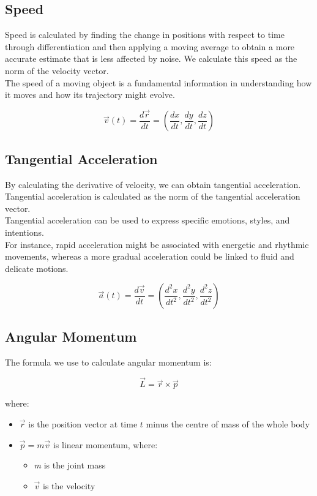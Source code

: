\subsection{Speed}
Speed is calculated by finding the change in positions with respect to time through differentiation and then applying a moving average to obtain a more accurate estimate that is less affected by noise.
We calculate this speed as the norm of the velocity vector. \\
The speed of a moving object is a fundamental information in understanding how it moves and how its trajectory might evolve.

\begin{equation}
  \vec{v}(t) = \frac{d\vec{r}}{dt} = \left(\frac{dx}{dt}, \frac{dy}{dt}, \frac{dz}{dt}\right)
\end{equation}

\subsection{Tangential Acceleration}
By calculating the derivative of velocity, we can obtain tangential acceleration.
Tangential acceleration is calculated as the norm of the tangential acceleration vector. \\
Tangential acceleration can be used to express specific emotions, styles, and intentions. \\
For instance, rapid acceleration might be associated with energetic and rhythmic movements, whereas a more gradual acceleration could be linked to fluid and delicate motions.

\begin{equation}
  \vec{a}(t) = \frac{d\vec{v}}{dt} = \left(\frac{d^2x}{dt^2}, \frac{d^2y}{dt^2}, \frac{d^2z}{dt^2}\right)
\end{equation}

\subsection{Angular Momentum}
The formula we use to calculate angular momentum is:

\begin{equation}
  \vec{L} = \vec{r} \times \vec{p}
\end{equation}

where:

\begin{itemize}
  \item \(\vec{r}\) is the position vector at time \(t\) minus the centre of mass of the whole body
  \item \(\vec{p} = m \vec{v}\) is linear momentum, where:

\begin{itemize}
  \item \textit{m} is the joint mass
  \item \(\vec{v}\) is the velocity
\end{itemize}

\end{itemize}

